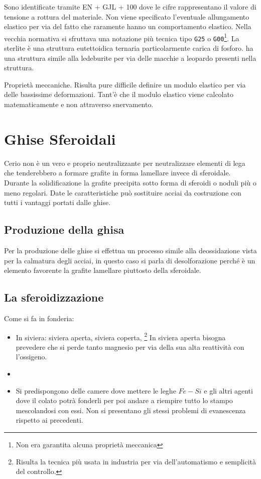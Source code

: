 Sono identificate tramite EN + GJL + 100 dove le cifre rappresentano il valore di tensione a rottura del materiale. Non viene specificato l'eventuale allungamento elastico per via del fatto che raramente hanno un comportamento elastico.
Nella vecchia normativa si sfruttava una notazione più tecnica tipo \texttt{G25} o \texttt{G00}\footnote{Non era garantita alcuna proprietà meccanica}.
La sterlite è una struttura eutettoidica ternaria particolarmente carica di fosforo. ha una struttura simile alla ledeburite per via delle macchie a leopardo presenti nella struttura.

Proprietà meccaniche. Risulta pure difficile definire un modulo elastico per via delle bassissime deformazioni. Tant'è che il modulo elastico viene calcolato matematicamente e non attraverso snervamento.


\section{Ghise Sferoidali}
Cerio non è un vero e proprio neutralizzante per neutralizzare elementi di lega che tenderebbero a formare grafite in forma lamellare invece di sferoidale.
Durante la solidificazione la grafite precipita sotto forma di sferoidi o noduli più o meno regolari.
Date le caratteristiche può sostituire acciai da costruzione con tutti i vantaggi portati dalle ghise.

\subsection{Produzione della ghisa}
Per la produzione delle ghise si effettua un processo simile alla deossidazione vista per la calmatura degli acciai, in questo caso si parla di desolforazione perché è un elemento favorente la grafite lamellare piuttosto della sferoidale.

\subsection{La sferoidizzazione}
Come si fa in fonderia:
\begin{itemize}
\item In siviera: siviera aperta, siviera coperta, %
\footnote{Risulta la tecnica più usata in industria per via dell'automatismo e semplicità del controllo.}
In siviera aperta bisogna prevedere che si perde tanto magnesio per via della sua alta reattività con l'ossigeno.
\item {}
\item {} Si predispongono delle camere dove mettere le leghe $Fe-Si$ e gli altri agenti dove il colato potrà fonderli per poi andare a riempire tutto lo stampo mescolandosi con essi. Non si presentano gli stessi problemi di evanescenza rispetto ai precedenti.
\end{itemize}

